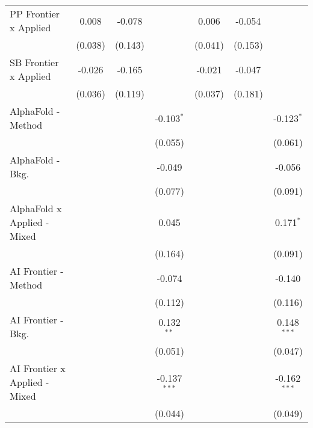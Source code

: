 \begin{tabular}{lcccccc}
   PP Frontier x Applied          & 0.008         & -0.078      &                & 0.006          & -0.054      &   \\   
                                  & (0.038)       & (0.143)     &                & (0.041)        & (0.153)     &   \\   
   SB Frontier x Applied          & -0.026        & -0.165      &                & -0.021         & -0.047      &   \\   
                                  & (0.036)       & (0.119)     &                & (0.037)        & (0.181)     &   \\   
   AlphaFold - Method             &               &             & -0.103$^{*}$   &                &             & -0.123$^{*}$\\   
                                  &               &             & (0.055)        &                &             & (0.061)\\   
   AlphaFold - Bkg.               &               &             & -0.049         &                &             & -0.056\\   
                                  &               &             & (0.077)        &                &             & (0.091)\\   
   AlphaFold x Applied - Mixed    &               &             & 0.045          &                &             & 0.171$^{*}$\\   
                                  &               &             & (0.164)        &                &             & (0.091)\\   
   AI Frontier - Method           &               &             & -0.074         &                &             & -0.140\\   
                                  &               &             & (0.112)        &                &             & (0.116)\\   
   AI Frontier - Bkg.             &               &             & 0.132$^{**}$   &                &             & 0.148$^{***}$\\   
                                  &               &             & (0.051)        &                &             & (0.047)\\   
   AI Frontier x Applied - Mixed  &               &             & -0.137$^{***}$ &                &             & -0.162$^{***}$\\   
                                  &               &             & (0.044)        &                &             & (0.049)\\   

\end{tabular}
